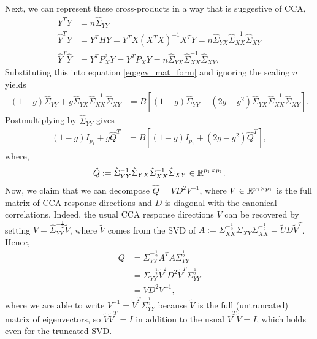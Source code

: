 \documentclass[14pt]{extarticle}
\begin{document}
Next, we can represent these cross-products in a way that is suggestive of CCA,
\begin{align*}
  Y^{T}Y &= n \hat{\Sigma}_{YY} \\
  \hat{Y}^{T}Y &= Y^{T}HY = Y^{T}X\left(X^{T}X\right)^{-1}X^{T}Y =
  n\hat{\Sigma}_{YX}\hat{\Sigma}_{XX}^{-1} \hat{\Sigma}_{XY} \\
  \hat{Y}^{T}\hat{Y} &= Y^{T}P_{X}^2 Y = Y^{T}P_{X}Y=
  n\hat{\Sigma}_{YX}\hat{\Sigma}_{XX}^{-1} \hat{\Sigma}_{XY},
\end{align*}
Substituting this into equation \ref{eq:gcv_mat_form} and ignoring the scaling
$n$ yields
\begin{align*}
\left(1 - g\right)\hat{\Sigma}_{YY} + g
\hat{\Sigma}_{YX}\hat{\Sigma}_{XX}^{-1}\hat{\Sigma}_{XY} &=
B\left[\left(1 - g\right)\hat{\Sigma}_{YY} + \left(2g -
    g^{2}\right)\hat{\Sigma}_{YX}\hat{\Sigma}_{XX}^{-1}\hat{\Sigma}_{XY}\right].
\end{align*}
Postmultiplying by $\hat{\Sigma}_{YY}$ gives
\begin{align}
  \left(1 - g\right)I_{p_{1}} + g\hat{Q}^{T} &= B\left[\left(1 -
      g\right)I_{p_{1}} + \left(2g -
      g^{2}\right)\hat{Q}^{T}\right], \label{eq:cca_gcv_id}
\end{align}
where,
\begin{align*}
\hat{Q} :=
\hat{\Sigma}_{YY}^{-1}\hat{\Sigma}_{YX}\hat{\Sigma}_{XX}^{-1}\hat{\Sigma}_{XY}
\in \mathbb{R}^{p_{1}\times p_{1}}.
\end{align*}
Now, we claim that we can decompose $\hat{Q} = VD^{2}V^{-1}$, where $V \in
\mathbb{R}^{p_{1} \times p_{1}}$ is the full matrix of CCA response directions and
$D$ is diagonal with the canonical correlations. Indeed, the usual CCA response
directions $V$ can be recovered by setting $V =
\hat{\Sigma}_{YY}^{-\frac{1}{2}}\tilde{V}$, where $\tilde{V}$ comes from the SVD
of $A := \Sigma_{XX}^{-\frac{1}{2}}\Sigma_{XY}\Sigma_{XX}^{-\frac{1}{2}} =
\tilde{U}D\tilde{V}^{T}$. Hence,
\begin{align*}
  Q &= \Sigma_{YY}^{-\frac{1}{2}}A^{T}A\Sigma_{YY}^{\frac{1}{2}} \\
  &= \Sigma_{YY}^{-\frac{1}{2}}\tilde{V}^{2}D^{2}\tilde{V}^{T}\Sigma_{YY}^{\frac{1}{2}}\\
  &= VD^{2}V^{-1},
\end{align*}
where we are able to write $V^{-1} = \tilde{V}^{T}\Sigma_{YY}^{\frac{1}{2}}$
because $\tilde{V}$ is the full (untruncated) matrix of eigenvectors, so
$\tilde{V}\tilde{V}^{T} = I$ in addition to the usual $\tilde{V}^{T}\tilde{V}
=I$, which holds even for the truncated SVD.
\end{document}
